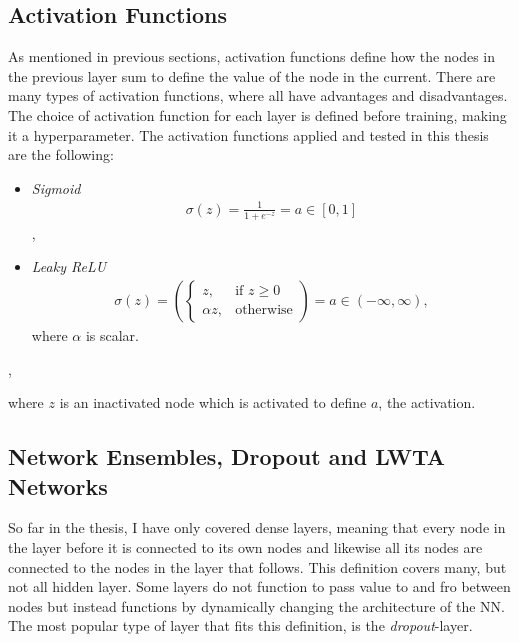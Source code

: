 \subsection{Activation Functions}\label{subsec:activation}
As mentioned in previous sections, activation functions define how the nodes in the previous layer 
sum to define the value of the node in the current. There are many types of activation functions, 
where all have advantages and disadvantages. The choice of activation function for each layer is defined
before training, making it a hyperparameter. The activation functions applied and tested in this thesis are the following:
\begin{center}
\begin{itemize}
    \item  \emph{Sigmoid}\\  
    \begin{align*}
         \sigma{(z)} = \frac{1}{1+e^{-z}} = a \in [0,1]
    \end{align*},
    \item \emph{Leaky ReLU}
    \begin{align*}
        \sigma{(z)} = \left(
        \begin{cases}
            z,& \text{if } z\geq 0\\
            \alpha z,              & \text{otherwise}
        \end{cases}\right)
        = a \in (-\infty, \infty),
   \end{align*}
   where $\alpha$ is scalar.
\end{itemize},
\end{center}
where $z$ is an inactivated node which is activated to define $a$, the activation.

\subsection{Network Ensembles, Dropout and LWTA Networks}\label{subsec:LWTA}
So far in the thesis, I have only covered dense layers, meaning that every node in the layer before it is 
connected to its own nodes and likewise all its nodes are connected to the nodes in the layer that follows. 
This definition covers many, but not all hidden layer. Some layers do not function to pass value to and 
fro between nodes but instead functions by dynamically changing the architecture of the \ac{NN}. The most popular 
type of layer that fits this definition, is the \emph{dropout}-layer. 
